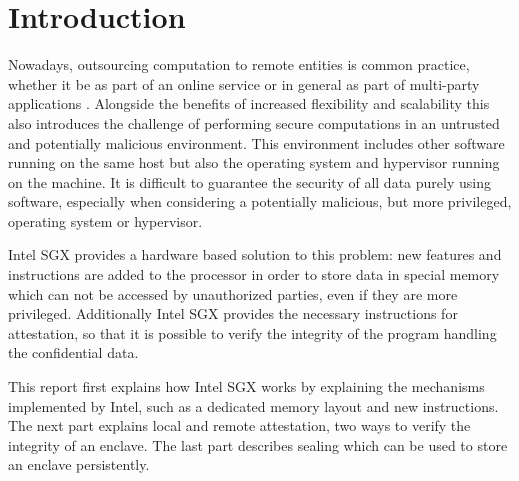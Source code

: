 \section{Introduction} \label{sec:introduction}
Nowadays, outsourcing computation to remote entities is common practice, whether it be as part of an online service or 
in general as part of multi-party applications \cite{UseOfIntelSGX}. 
Alongside the benefits of increased flexibility and scalability this also introduces the challenge of performing secure 
computations in an untrusted and potentially malicious environment. 
This environment includes other software running on the same host but also the operating system and hypervisor running
on the machine.
It is difficult to guarantee the security of all data purely using software, especially when considering a potentially 
malicious, but more privileged, operating system or hypervisor.

Intel SGX provides a hardware based solution to this problem: new features and instructions are added to the processor
in order to store data in special memory which can not be accessed by unauthorized parties, even if they are more
privileged. Additionally Intel SGX provides the necessary instructions for attestation, so that it is possible to
verify the integrity of the program handling the confidential data.

This report first explains how Intel SGX works by explaining the mechanisms implemented by Intel, such as a
dedicated memory layout and new instructions. The next part explains local and remote attestation, two ways to
verify the integrity of an enclave. The last part describes sealing which can be used to store an enclave persistently.

